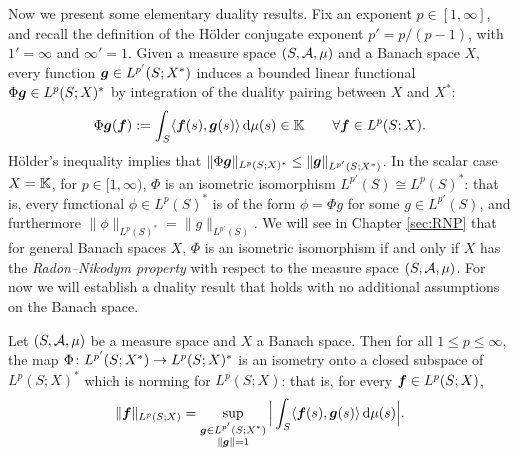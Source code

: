 Now we present some elementary duality results.
Fix an exponent $p \in [1,\infty]$, and recall the definition of the H\"older conjugate exponent $p' = p/(p-1)$, with $1' = \infty$ and $\infty' = 1$.
Given a measure space $(S,\mathcal{A},\mu)$ and a Banach space $X$, every function $\bm{g} \in L^{p'}(S;X^*)$ induces a bounded linear functional $\Phi \bm{g} \in L^p(S;X)^*$ by integration of the duality pairing between $X$ and $X^*$:
\begin{equation*}
  \Phi \bm{g}(\bm{f}) := \int_S \langle \bm{f}(s), \bm{g}(s) \rangle \, \mathrm{d}\mu(s) \in \mathbb{K} \qquad \forall \bm{f} \in L^p(S;X).
\end{equation*}
H\"older's inequality implies that $\|\Phi \bm{g}\|_{L^p(S;X)^*} \leq \|\bm{g}\|_{L^{p'}(S;X^*)}$.
In the scalar case $X = \mathbb{K}$, for $p \in [1,\infty)$, $\Phi$ is an isometric isomorphism $L^{p'}(S) \cong L^p(S)^*$: that is, every functional $\phi \in L^p(S)^*$ is of the form $\phi = \Phi g$ for some $g \in L^{p'}(S)$, and furthermore $\|\phi\|_{L^p(S)^*} = \|g\|_{L^{p'}(S)}$.
We will see in Chapter \ref{sec:RNP} that for general Banach spaces $X$, $\Phi$ is an isometric isomorphism if and only if $X$ has the \emph{Radon--Nikodym property} with respect to the measure space $(S,\mathcal{A},\mu)$.
For now we will establish a duality result that holds with no additional assumptions on the Banach space.

\begin{prop}\label{prop:bochner-preduality}
  Let $(S,\mathcal{A},\mu)$ be a measure space and $X$ a Banach space.
  Then for all $1 \leq p \leq \infty$, the map $\Phi \colon L^{p'}(S;X^*) \rightarrow L^p(S;X)^*$ is an isometry onto a closed subspace of $L^p(S;X)^*$ which is norming for $L^p(S;X)$: that is, for every $\bm{f} \in L^p(S;X)$,
  \begin{equation*}
    \|\bm{f}\|_{L^p(S;X)} = \sup_{\substack{\bm{g} \in L^{p'}(S;X^*) \\ \|\bm{g}\| = 1}} \Big| \int_S \langle \bm{f}(s), \bm{g}(s) \rangle \, \mathrm{d}\mu(s) \Big|.
  \end{equation*}
\end{prop}

